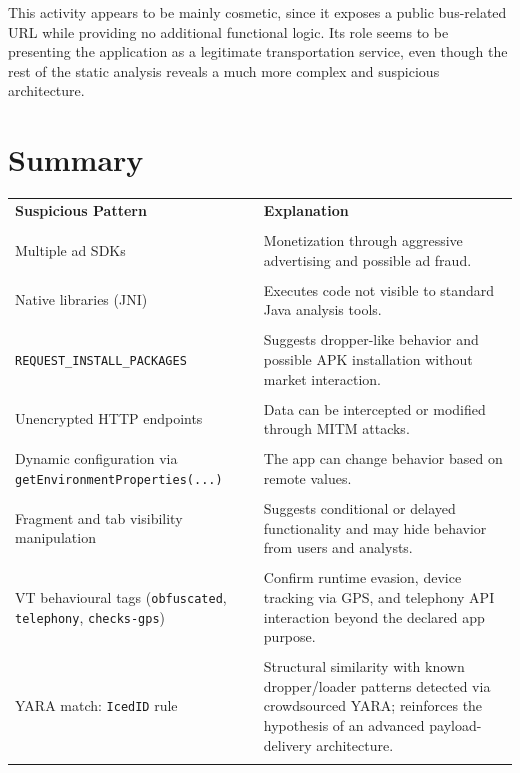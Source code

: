 This activity appears to be mainly cosmetic, since it exposes a public bus-related URL while providing no additional functional logic. Its role seems to be presenting the application as a legitimate transportation service, even though the rest of the static analysis reveals a much more complex and suspicious architecture.

\section{Summary}

\begin{longtable}{|p{}|p{}|}
\hline
\textbf{Suspicious Pattern} & \textbf{Explanation} \\\\
\hline
Multiple ad SDKs & Monetization through aggressive advertising and possible ad fraud. \\\\
\hline
Native libraries (JNI) & Executes code not visible to standard Java analysis tools. \\\\
\hline
\texttt{REQUEST\_INSTALL\_PACKAGES} & Suggests dropper-like behavior and possible APK installation without market interaction. \\\\
\hline
Unencrypted HTTP endpoints & Data can be intercepted or modified through MITM attacks. \\\\
\hline
Dynamic configuration via \texttt{getEnvironmentProperties(...)} & The app can change behavior based on remote values. \\\\
\hline
Fragment and tab visibility manipulation & Suggests conditional or delayed functionality and may hide behavior from users and analysts. \\\\
\hline
VT behavioural tags (\texttt{obfuscated}, \texttt{telephony}, \texttt{checks-gps}) & Confirm runtime evasion, device tracking via GPS, and telephony API interaction beyond the declared app purpose. \\\\
\hline
YARA match: \texttt{IcedID} rule & Structural similarity with known dropper/loader patterns detected via crowdsourced YARA; reinforces the hypothesis of an advanced payload-delivery architecture. \\\\
\hline
\end{longtable}

